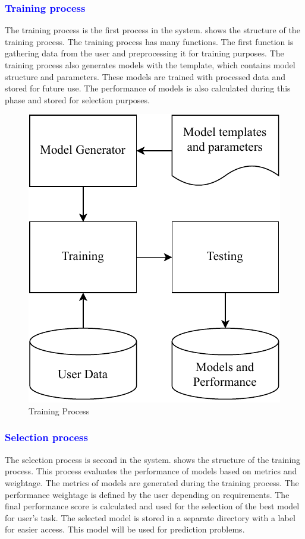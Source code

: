 \documentclass[a4paper,fleqn]{cas-dc}
\newcommand{\responsemodsm}[1]{\textcolor{blue}{#1}}
\newcommand{\subsubsectionb}[1]{\subsubsection{\responsemodsm{#1}}}
\begin{document}
\subsubsectionb{Training process}\label{subsubsec:training_process}

The training process is the first process in the system.  shows the structure of the training process. The training process has many functions. The first function is gathering data from the user and preprocessing it for training purposes. The training process also generates models with the template, which contains model structure and parameters. These models are trained with processed data and stored for future use. The performance of models is also calculated during this phase and stored for selection purposes.

\begin{figure}[ht]
    \centering
    \includegraphics[width=0.7\columnwidth]{training_and_testing.pdf}
    \caption{Training Process}
    \label{fig:training_process}
\end{figure}

\subsubsectionb{Selection process}\label{subsubsec:selection_process}

The selection process is second in the system.  shows the structure of the training process. This process evaluates the performance of models based on metrics and weightage. The metrics of models are generated during the training process. The performance weightage is defined by the user depending on requirements. The final performance score is calculated and used for the selection of the best model for user's task. The selected model is stored in a separate directory with a label for easier access. This model will be used for prediction problems.
\end{document}
